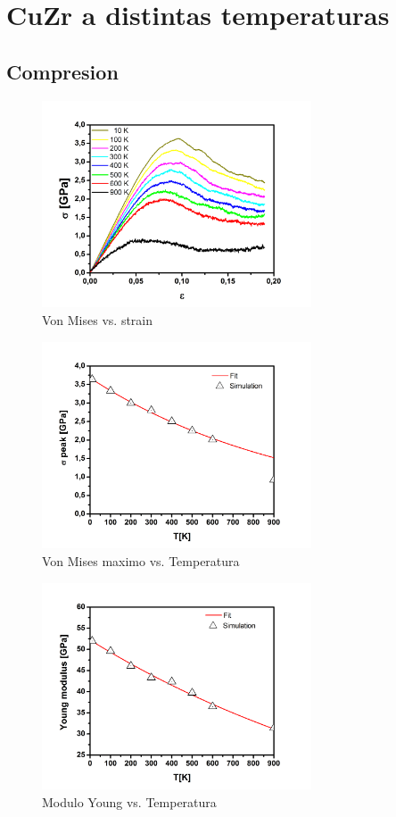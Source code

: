 \documentclass[10pt, oneside]{article} %
\begin{document}
 
\section{CuZr a distintas temperaturas}

%
%

\subsection{Compresion}

\begin{figure}[H]
\centering
\includegraphics[width=8cm]{Figures/stress_strain_COMP.png}
\caption{Von Mises vs. strain}
\end{figure}

\begin{figure}[H]
\centering
\includegraphics[width=8cm]{Figures/peakstress_T_COMP.png}
\caption{Von Mises maximo vs. Temperatura}
\end{figure}

\begin{figure}[H]
\centering
\includegraphics[width=8cm]{Figures/young_T_COMP.png}
\caption{Modulo Young vs. Temperatura}
\end{figure}
\end{document}
